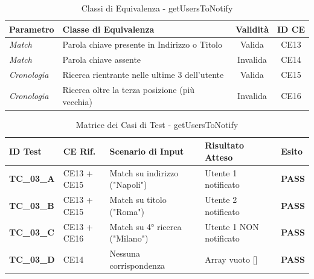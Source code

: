 \documentclass{article}
\begin{document}
\newpage

\renewcommand{\arraystretch}{1.5}
\begin{table}[H]
    \centering
    \caption{Classi di Equivalenza - getUsersToNotify}
    \begin{tabularx}{\textwidth}{|l|X|c|c|}
        \hline
        \rowcolor{DarkBlue}
        \textbf{\color{white}Parametro} & \textbf{\color{white}Classe di Equivalenza}    & \textbf{\color{white}Validità} & \textbf{\color{white}ID CE} \\ \hline
        \rowcolor[gray]{0.95}
        \textit{Match}                  & Parola chiave presente in Indirizzo o Titolo   & Valida                         & CE13                        \\ \hline
        \textit{Match}                  & Parola chiave assente                          & Invalida                       & CE14                        \\ \hline
        \rowcolor[gray]{0.95}
        \textit{Cronologia}             & Ricerca rientrante nelle ultime 3 dell'utente  & Valida                         & CE15                        \\ \hline
        \textit{Cronologia}             & Ricerca oltre la terza posizione (più vecchia) & Invalida                       & CE16                        \\ \hline
    \end{tabularx}
\end{table}

\begin{table}[H]
    \centering
    \caption{Matrice dei Casi di Test - getUsersToNotify}
    \begin{tabularx}{\textwidth}{|l|l|X|l|l|}
        \hline
        \rowcolor{DarkBlue}
        \textbf{\color{white}ID Test} & \textbf{\color{white}CE Rif.} & \textbf{\color{white}Scenario di Input} & \textbf{\color{white}Risultato Atteso} & \textbf{\color{white}Esito}      \\ \hline
        \textbf{TC\_03\_A}            & CE13 + CE15                   & Match su indirizzo ("Napoli")           & Utente 1 notificato                    & {\color{codegreen}\textbf{PASS}} \\ \hline
        \textbf{TC\_03\_B}            & CE13 + CE15                   & Match su titolo ("Roma")                & Utente 2 notificato                    & {\color{codegreen}\textbf{PASS}} \\ \hline
        \textbf{TC\_03\_C}            & CE13 + CE16                   & Match su 4° ricerca ("Milano")          & Utente 1 NON notificato                & {\color{codegreen}\textbf{PASS}} \\ \hline
        \textbf{TC\_03\_D}            & CE14                          & Nessuna corrispondenza                  & Array vuoto []                         & {\color{codegreen}\textbf{PASS}} \\ \hline
    \end{tabularx}
\end{table}
\end{document}

